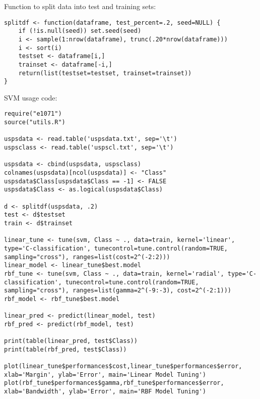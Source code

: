 \documentclass[11pt]{article}
\theoremstyle{quest}
\begin{document}
\begin{adjustwidth}{3.5em}{0em}
Function to split data into test and training sets:
\begin{lstlisting}
splitdf <- function(dataframe, test_percent=.2, seed=NULL) {
    if (!is.null(seed)) set.seed(seed)
    i <- sample(1:nrow(dataframe), trunc(.20*nrow(dataframe)))
    i <- sort(i)
    testset <- dataframe[i,]
    trainset <- dataframe[-i,]
    return(list(testset=testset, trainset=trainset))
}
\end{lstlisting}

SVM usage code:
\begin{lstlisting}
require("e1071")
source("utils.R")

uspsdata <- read.table('uspsdata.txt', sep='\t')
uspsclass <- read.table('uspscl.txt', sep='\t')

uspsdata <- cbind(uspsdata, uspsclass)
colnames(uspsdata)[ncol(uspsdata)] <- "Class"
uspsdata$Class[uspsdata$Class == -1] <- FALSE
uspsdata$Class <- as.logical(uspsdata$Class)

d <- splitdf(uspsdata, .2) 
test <- d$testset
train <- d$trainset

linear_tune <- tune(svm, Class ~ ., data=train, kernel='linear', type='C-classification', tunecontrol=tune.control(random=TRUE, sampling="cross"), ranges=list(cost=2^(-2:2)))
linear_model <- linear_tune$best.model
rbf_tune <- tune(svm, Class ~ ., data=train, kernel='radial', type='C-classification', tunecontrol=tune.control(random=TRUE, sampling="cross"), ranges=list(gamma=2^(-9:-3), cost=2^(-2:1)))
rbf_model <- rbf_tune$best.model

linear_pred <- predict(linear_model, test)
rbf_pred <- predict(rbf_model, test)

print(table(linear_pred, test$Class))
print(table(rbf_pred, test$Class))

plot(linear_tune$performances$cost,linear_tune$performances$error, xlab='Margin', ylab='Error', main='Linear Model Tuning')
plot(rbf_tune$performances$gamma,rbf_tune$performances$error, xlab='Bandwidth', ylab='Error', main='RBF Model Tuning')
\end{lstlisting}
\end{adjustwidth}


\end{document}
